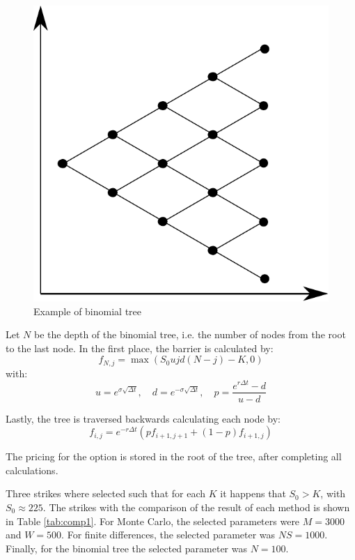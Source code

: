 \documentclass[11pt]{article}
\theoremstyle{definition}
\theoremstyle{remark}
\theoremstyle{remark}
\newcommand{\expp}[1]{e^{#1}}
\begin{document}
\begin{figure}[ht]
  \centering
  \includegraphics[scale=.5]{../plts/binomial-tree-example}
  \caption{Example of binomial tree}
  \label{fig:btex}
\end{figure}

Let $N$ be the depth of the binomial tree, i.e. the number of nodes from the
root to the last node. In the first place, the barrier is calculated by:
\begin{equation*}
  f_{N, j} = \max(S_{0}ujd(N - j) - K, 0)
\end{equation*}
with:
\begin{equation*}
  u = \expp{\sigma \sqrt{\Delta t}}, \quad d = \expp{-\sigma \sqrt{\Delta t}}, \quad
  p = \frac{\expp{r \Delta t} - d}{u - d}
\end{equation*}

Lastly, the tree is traversed backwards calculating each node by:
\begin{equation*}
  f_{i, j} = \expp{-r \Delta t} (p f_{i + 1, j+1} + (1 - p)  f_{i+1, j})
\end{equation*}

The pricing for the option is stored in the root of the tree, after completing
all calculations.

Three strikes where selected such that for each $K$ it happens that $S_0 > K$,
with $S_0 \approx 225$. The strikes with the comparison of the result of each
method is shown in Table \ref{tab:comp1}. For Monte Carlo, the selected
parameters were $M=3000$ and $W=500$. For finite differences, the selected
parameter was $NS = 1000$. Finally, for the binomial tree the selected parameter
was $N=100$.
\end{document}
